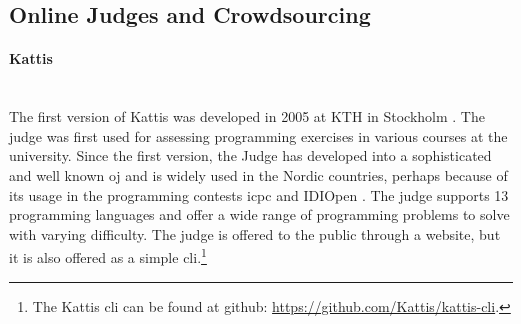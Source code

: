\subsection{Online Judges and Crowdsourcing}
\label{subsec:oj&c}

\paragraph*{Kattis} \hfill \\
The first version of Kattis was developed in 2005 at KTH in Stockholm \cite{a:Enstrom2011}. The judge was first used for assessing programming exercises in various courses at the university. Since the first version, the Judge has developed into a sophisticated and well known \gls{oj} and is widely used in the Nordic countries, perhaps because of its usage in the programming contests \gls{icpc} \cite{ICPC} and IDIOpen \cite{IDIOPEN}. The judge supports 13 programming languages and offer a wide range of programming problems to solve with varying difficulty. The judge is offered to the public through a website, but it is also offered as a simple \gls{cli}.\footnote{The Kattis \gls{cli} can be found at github: \url{https://github.com/Kattis/kattis-cli}.} \\

